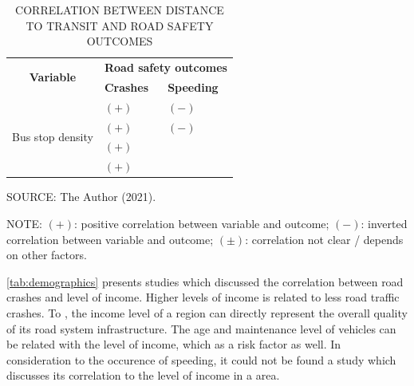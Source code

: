 \begin{table}[!hbtp]
    \footnotesize
    \captionsetup{justification=raggedright,
        singlelinecheck=false,
        font=footnotesize}
    \caption{CORRELATION BETWEEN DISTANCE TO TRANSIT AND ROAD SAFETY OUTCOMES}
    \centering
    \begin{tabular}{p{2.5cm}p{6.2cm}p{6.2cm}}
        \hline
        \multicolumn{1}{c}{\multirow{2}{2.5cm}{\textbf{Variable}}} & \multicolumn{2}{c}{\textbf{Road safety outcomes}} \\
        \multicolumn{1}{c}{} & \textbf{Crashes} & \textbf{Speeding} \\ \hline
        \multirow{4}{2.5cm}{Bus stop density}  
         & $(+)$ \textcite{Obelheiro2020} & $(-)$ \textcite{Bansal2014} \\
         & $(+)$ \textcite{Ouyang2014} &  $(-)$ \textcite{Koshy2005} \\
         & $(+)$ \textcite{Wei2013} &  \\ 
         & $(+)$ \textcite{Kim2010} &  \\ \hline
    \end{tabular}
    \label{tab:distance}
    \par \vspace{2mm} \footnotesize \raggedright
    SOURCE: The Author (2021).
    \par \vspace{1mm} \footnotesize \raggedright
    NOTE: $(+)$: positive correlation between variable and outcome; $(-)$: inverted correlation between variable and outcome; $(\pm)$: correlation not clear / depends on other factors.
\end{table}

\autoref{tab:demographics} presents studies which discussed the correlation between road crashes and level of income. Higher levels of income is related to less road traffic crashes. To \textcite{Obelheiro2019}, the income level of a region can directly represent the overall quality of its road system infrastructure. The age and maintenance level of vehicles can be related with the level of income, which as a risk factor as well. In consideration to the occurence of speeding, it could not be found a study which discusses its correlation to the level of income in a area. 

